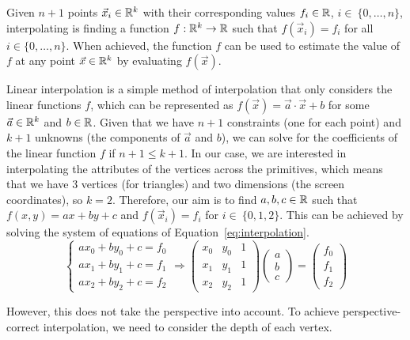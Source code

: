 Given $n+1$ points $\vec{x}_i\in \mathbb{R}^k$ with their corresponding values $f_i\in \mathbb{R}$, $i\in~\{0, \ldots, n\}$, interpolating is finding a function $f:\mathbb{R}^k\to \mathbb{R}$ such that $f(\vec{x}_i) = f_i$ for all $i\in \{0, \ldots, n\}$. When achieved, the function $f$ can be used to estimate the value of $f$ at any point $\vec{x}\in \mathbb{R}^k$ by evaluating $f(\vec{x})$.

Linear interpolation is a simple method of interpolation that only considers the linear functions $f$, which can be represented as $f(\vec{x}) = \vec{a}\cdot \vec{x} + b$ for some $\vec{a}\in \mathbb{R}^k$ and $b\in \mathbb{R}$. Given that we have $n+1$ constraints (one for each point) and $k+1$ unknowns (the components of $\vec{a}$ and $b$), we can solve for the coefficients of the linear function $f$ if $n+1 \leq k+1$. In our case, we are interested in interpolating the attributes of the vertices across the primitives, which means that we have $3$ vertices (for triangles) and two dimensions (the screen coordinates), so $k=2$. Therefore, our aim is to find $a,b,c\in \mathbb{R}$ such that $f(x,y) = ax + by + c$ and $f(\vec{x}_i) = f_i$ for $i\in~\{0, 1, 2\}$. This can be achieved by solving the system of equations of Equation~\eqref{eq:interpolation}.
\begin{equation}
    \begin{cases}
        ax_0 + by_0 + c = f_0\\
        ax_1 + by_1 + c = f_1\\
        ax_2 + by_2 + c = f_2
    \end{cases}
    \Longrightarrow
    \begin{pmatrix}
        x_0 & y_0 & 1\\
        x_1 & y_1 & 1\\
        x_2 & y_2 & 1
    \end{pmatrix}
    \begin{pmatrix}
        a\\
        b\\
        c
    \end{pmatrix}
    =
    \begin{pmatrix}
        f_0\\
        f_1\\
        f_2
    \end{pmatrix}
    \label{eq:interpolation}
\end{equation}

However, this does not take the perspective into account. To achieve perspective-correct interpolation, we need to consider the depth of each vertex.

